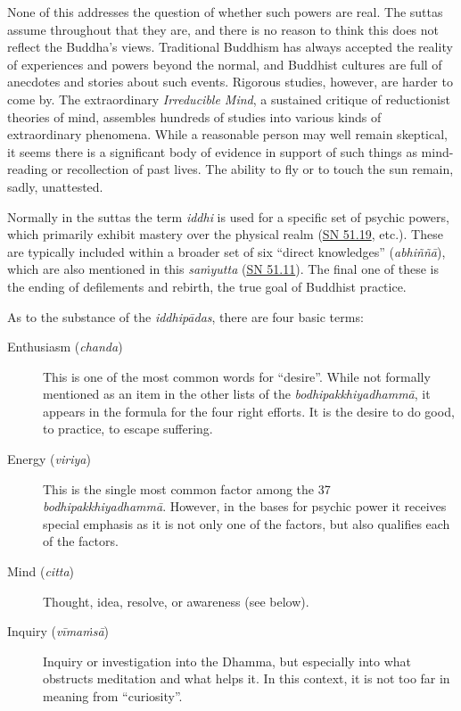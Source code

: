 \documentclass[12pt,openany]{book}%
\begin{document}
None of this addresses the question of whether such powers are real. The suttas assume throughout that they are, and there is no reason to think this does not reflect the Buddha’s views. Traditional Buddhism has always accepted the reality of experiences and powers beyond the normal, and Buddhist cultures are full of anecdotes and stories about such events. Rigorous studies, however, are harder to come by. The extraordinary \textit{Irreducible Mind}, a sustained critique of reductionist theories of mind, assembles hundreds of studies into various kinds of extraordinary phenomena. While a reasonable person may well remain skeptical, it seems there is a significant body of evidence in support of such things as mind-reading or recollection of past lives. The ability to fly or to touch the sun remain, sadly, unattested.

Normally in the suttas the term \textit{iddhi} is used for a specific set of psychic powers, which primarily exhibit mastery over the physical realm (\href{https://suttacentral.net/sn51.19}{SN 51.19}, etc.). These are typically included within a broader set of six “direct knowledges” (\textit{\textsanskrit{abhiññā}}), which are also mentioned in this \textit{\textsanskrit{saṁyutta}} (\href{https://suttacentral.net/sn51.11}{SN 51.11}). The final one of these is the ending of defilements and rebirth, the true goal of Buddhist practice.

As to the substance of the \textit{\textsanskrit{iddhipādas}}, there are four basic terms:

\begin{description}%
\item[Enthusiasm (\textit{chanda})] This is one of the most common words for “desire”. While not formally mentioned as an item in the other lists of the \textit{\textsanskrit{bodhipakkhiyadhammā}}, it appears in the formula for the four right efforts. It is the desire to do good, to practice, to escape suffering.%
\item[Energy (\textit{viriya})] This is the single most common factor among the 37 \textit{\textsanskrit{bodhipakkhiyadhammā}}. However, in the bases for psychic power it receives special emphasis as it is not only one of the factors, but also qualifies each of the factors.%
\item[Mind (\textit{citta})] Thought, idea, resolve, or awareness (see below).%
\item[Inquiry (\textit{\textsanskrit{vīmaṁsā}})] Inquiry or investigation into the Dhamma, but especially into what obstructs meditation and what helps it. In this context, it is not too far in meaning from “curiosity”.%
\end{description}
\end{document}
